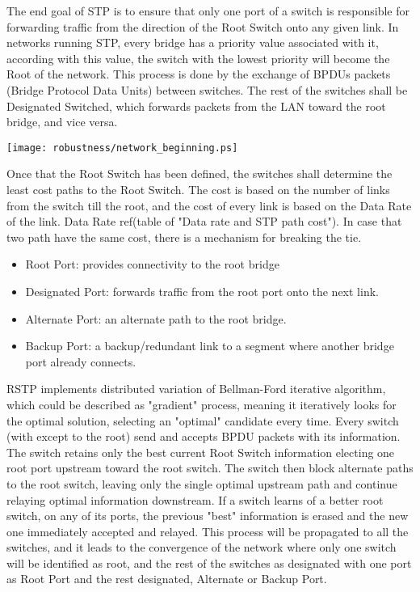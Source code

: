 The end goal of STP is to ensure that only one port of a switch is responsible 
for forwarding traffic from the direction of the Root Switch onto any given
link. In networks running STP, every bridge has a priority value associated with
it, according with this value, the switch with the lowest priority will become
the Root of the network.  This process is done by the exchange of BPDUs packets
(Bridge Protocol Data Units) between switches. The rest of the switches shall be
Designated Switched, which forwards packets from the LAN toward the root bridge,
and vice versa.

\begin{center}
        \texttt{[image: robustness/network\_beginning.ps]}
        \label{fig:redunt_net}
\end{center}


Once that the Root Switch has been defined, the switches shall determine
the least cost paths to the Root Switch. The cost is based on the number of
links from the switch till the root, and the cost of every link is based on the
Data Rate of the link. Data Rate ref(table of "Data rate and STP path cost"). In
case that two path have the same cost, there is a mechanism for breaking the
tie.

\begin{itemize}
        \item Root Port: provides connectivity to the root bridge
        \item Designated Port: forwards traffic from the root port onto the
next link.
        \item Alternate Port: an alternate path to the root bridge.
        \item Backup Port: a backup/redundant link to a segment where
another bridge port already connects.
\end{itemize}


RSTP implements distributed variation of Bellman-Ford iterative
algorithm, which could be described as "gradient" process, meaning it iteratively looks for the
optimal solution, selecting an "optimal" candidate every time. Every switch
(with except to the root) send and  accepts BPDU packets
with its information. The switch retains only the best current Root Switch
information electing one root port upstream toward the root switch. The switch
then block alternate paths to the root switch, leaving only the single optimal
upstream path and continue relaying optimal information downstream. If a switch
learns of a better root switch, on any of its ports, the previous "best"
information is erased and the new one immediately accepted and relayed. This
process will be propagated to all the switches, and it leads to the convergence
of the network where only one switch will be identified as root, and the rest of
the switches as designated with one port as Root Port and the rest designated,
Alternate or Backup Port.


